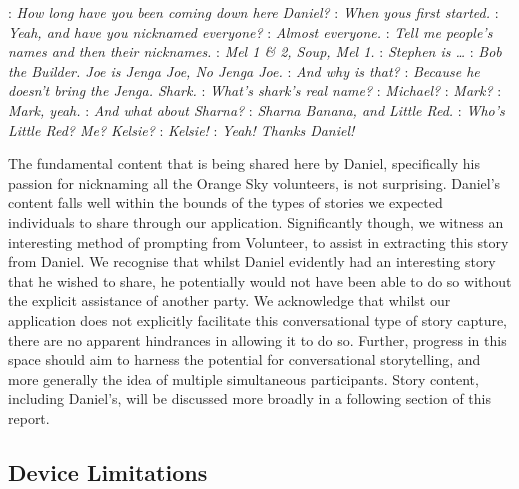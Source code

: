 \begin{drama}

    \volspeaks: \emph{How long have you been coming down here Daniel?}
    \danspeaks: \emph{When yous first started.}
    \volspeaks: \emph{Yeah, and have you nicknamed everyone?}
    \danspeaks: \emph{Almost everyone.}
    \volspeaks: \emph{Tell me people's names and then their nicknames.}
    \danspeaks: \emph{Mel 1 \& 2, Soup, Mel 1.}
    \volspeaks: \emph{Stephen is \dots}
    \danspeaks: \emph{Bob the Builder. Joe is Jenga Joe, No Jenga Joe.}
    \volspeaks: \emph{And why is that?}
    \danspeaks: \emph{Because he doesn't bring the Jenga. Shark.}
    \volspeaks: \emph{What's shark's real name?}
    \danspeaks: \emph{Michael?}
    \volspeaks: \emph{Mark?}
    \danspeaks: \emph{Mark, yeah.}
    \volspeaks: \emph{And what about Sharna?}
    \danspeaks: \emph{Sharna Banana, and Little Red.}
    \volspeaks: \emph{Who's Little Red? Me? Kelsie?}
    \danspeaks: \emph{Kelsie!}
    \volspeaks: \emph{Yeah! Thanks Daniel!}
\end{drama}

The fundamental content that is being shared here by Daniel, specifically his passion for nicknaming all the Orange Sky volunteers, is not surprising. Daniel's content falls well within the bounds of the types of stories we expected individuals to share through our application. Significantly though, we witness an interesting method of prompting from Volunteer, to assist in extracting this story from Daniel. We recognise that whilst Daniel evidently had an interesting story that he wished to share, he potentially would not have been able to do so without the explicit assistance of another party. We acknowledge that whilst our application does not explicitly facilitate this conversational type of story capture, there are no apparent hindrances in allowing it to do so. Further, progress in this space should aim to harness the potential for conversational storytelling, and more generally the idea of multiple simultaneous participants. Story content, including Daniel's, will be discussed more broadly in a following section of this report.

\subsection{Device Limitations}

